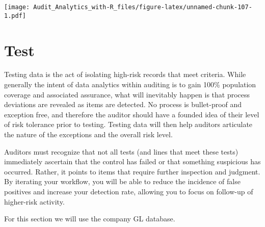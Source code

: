 \documentclass[
]{book}
\begin{document}
\texttt{[image: Audit\_Analytics\_with-R\_files/figure-latex/unnamed-chunk-107-1.pdf]}

\hypertarget{test}{%
\chapter{Test}\label{test}}

Testing data is the act of isolating high-risk records that meet criteria. While generally the intent of data analytics within auditing is to gain 100\% population coverage and associated assurance, what will inevitably happen is that process deviations are revealed as items are detected. No process is bullet-proof and exception free, and therefore the auditor should have a founded idea of their level of risk tolerance prior to testing. Testing data will then help auditors articulate the nature of the exceptions and the overall risk level.

Auditors must recognize that not all tests (and lines that meet these tests) immediately ascertain that the control has failed or that something suspicious has occurred. Rather, it points to items that require further inspection and judgment. By iterating your workflow, you will be able to reduce the incidence of false positives and increase your detection rate, allowing you to focus on follow-up of higher-risk activity.

For this section we will use the company GL database.
\end{document}
